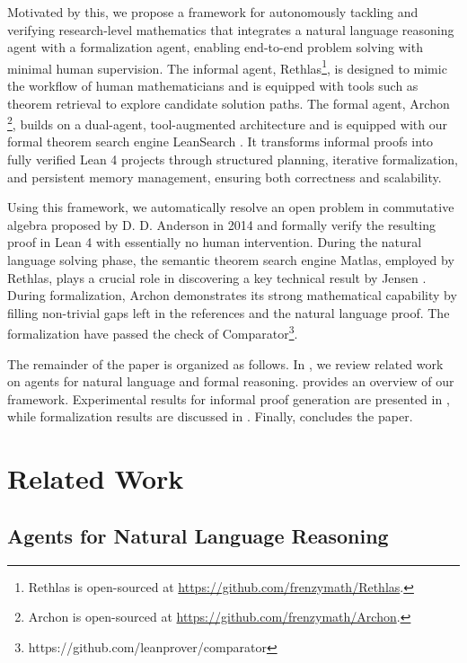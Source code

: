 \documentclass[]{pkuai4m}
\theoremstyle{plain}
\theoremstyle{definition}
\begin{document}
Motivated by this, we propose a framework for autonomously tackling and verifying research-level mathematics that integrates a natural language reasoning agent with a formalization agent, enabling end-to-end problem solving with minimal human supervision. The informal agent, Rethlas\footnote{Rethlas is open-sourced at \href{https://github.com/frenzymath/Rethlas}{https://github.com/frenzymath/Rethlas}.}, is designed to mimic the workflow of human mathematicians and is equipped with tools such as theorem retrieval to explore candidate solution paths. The formal agent, Archon \footnote{Archon is open-sourced at \href{https://github.com/frenzymath/Archon}{https://github.com/frenzymath/Archon}.}, builds on a dual-agent, tool-augmented architecture and is equipped with our formal theorem search engine LeanSearch \cite{gao2024semantic}. It transforms informal proofs into fully verified Lean 4 projects through structured planning, iterative formalization, and persistent memory management, ensuring both correctness and scalability.

Using this framework, we automatically resolve an open problem in commutative algebra proposed by D. D. Anderson in 2014 \cite{cahen2014open} and formally verify the resulting proof in Lean 4 with essentially no human intervention. During the natural language solving phase, the semantic theorem search engine Matlas, employed by Rethlas, plays a crucial role in discovering a key technical result by Jensen \cite{jensen2006completions}. During formalization, Archon demonstrates its strong mathematical capability by filling non-trivial gaps left in the references and the natural language proof. The formalization have passed the check of Comparator\footnote{https://github.com/leanprover/comparator}. 

The remainder of the paper is organized as follows. In , we review related work on agents for natural language and formal reasoning.  provides an overview of our framework. Experimental results for informal proof generation are presented in , while formalization results are discussed in . Finally,  concludes the paper.

\section{Related Work}\label{sec:related}
\subsection{Agents for Natural Language Reasoning}
\end{document}
